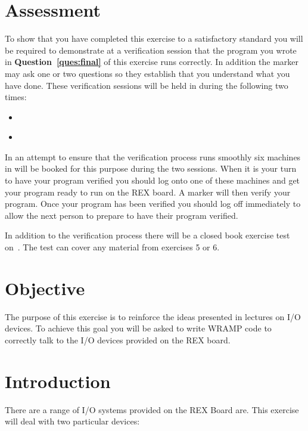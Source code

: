 \documentclass[a4paper,10pt]{article}
\begin{document}



\section{Assessment}

To show that you have completed this exercise to a satisfactory
standard you will be required to demonstrate at a verification session
that the program you wrote in \textbf{Question~\ref{ques:final}} of this exercise
runs correctly. In addition the marker may ask one or two questions so
they establish that you understand what you have done.  These
verification sessions will be held in \ASSESSROOM during the following two
times: 

\begin{itemize}
\item \IODUE~\MORNINGASSESS
\item \IODUE~\AFTERNOONASSESS
\end{itemize}

In an attempt to ensure that the verification process runs smoothly
six machines in \ASSESSROOM will be booked for this purpose during the two
sessions. When it is your turn to have your program verified you
should log onto one of these machines and get your program ready to
run on the REX board. A marker will then verify your program. Once
your program has been verified you should log off immediately to allow
the next person to prepare to have their program verified.

In addition to the verification process there will be a closed book
exercise test on~\textbf{\IOTEST}. The test can cover any material
from exercises 5 or 6.

\section{Objective}

The purpose of this exercise is to reinforce the ideas presented in
lectures on I/O devices. To achieve this goal you will be asked to
write WRAMP code to correctly talk to the I/O devices provided on the
REX board.

\section{Introduction}
There are a range of I/O systems provided on the REX Board are. This
exercise will deal with two particular devices:
\end{document}
